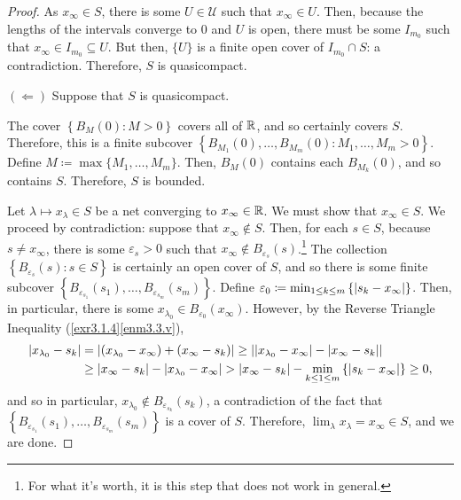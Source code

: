 \begin{thm}
\begin{savenotes}
\begin{proof}
As $x_\infty \in S$, there is some $U\in \mathcal{U}$ such that $x_\infty \in U$.  Then, because the lengths of the intervals converge to $0$ and $U$ is open, there must be some $I_{m_0}$ such that $x_\infty \in I_{m_0}\subseteq U$.  But then, $\{ U\}$ is a finite open cover of $I_{m_0}\cap S$:  a contradiction.  Therefore, $S$ is quasicompact.

\blankline
\noindent
$(\Leftarrow )$
Suppose that $S$ is quasicompact.

The cover $\left\{ B_M(0):M>0\right\}$ covers all of $\mathbb{R}$, and so certainly covers $S$.  Therefore, this is a finite subcover $\left\{ B_{M_1}(0),\ldots ,B_{M_m}(0):M_1,\ldots ,M_m>0\right\}$.  Define $M\coloneqq \max \{ M_1,\ldots ,M_m\}$.  Then, $B_M(0)$ contains each $B_{M_k}(0)$, and so contains $S$.  Therefore, $S$ is bounded.

Let $\lambda \mapsto x_\lambda \in S$ be a net converging to $x_\infty \in \mathbb{R}$.  We must show that $x_\infty \in S$.  We proceed by contradiction:  suppose that $x_\infty \notin S$.  Then, for each $s\in S$, because $s\neq x_\infty$, there is some $\varepsilon _s>0$ such that $x_\infty \notin B_{\varepsilon _s}(s)$.\footnote{For what it's worth, it is this step that does not work in general.}  The collection $\left\{ B_{\varepsilon _s}(s):s\in S\right\}$ is certainly an open cover of $S$, and so there is some finite subcover $\left\{ B_{\varepsilon _{s_1}}(s_1),\ldots ,B_{\varepsilon _{s_m}}(s_m)\right\}$.  Define $\varepsilon _0\coloneqq \min _{1\leq k\leq m}\left\{ \lvert s_k-x_\infty\rvert\right\}$.  Then, in particular, there is some $x_{\lambda _0}\in B_{\varepsilon _0}(x_\infty)$.  However, by the Reverse Triangle Inequality (\cref{exr3.1.4}\ref{enm3.3.v}),
\begin{equation}
\begin{split}
\lvert x_{\lambda _0}-s_k\rvert & =\left| (x_{\lambda _0}-x_\infty )+(x_\infty -s_k)\right| \geq \left| \left| x_{\lambda _0}-x_\infty \right| -\left| x_\infty -s_k\right| \right| \\
& \geq \left| x_\infty -s_k\right| -\left| x_{\lambda _0}-x_\infty \right| >\left| x_\infty -s_k\right| -\min _{k\leq 1\leq m}\left\{ \lvert s_k-x_\infty\rvert\right\} \geq 0,
\end{split}
\end{equation}
and so in particular, $x_{\lambda _0}\notin B_{\varepsilon _{s_k}}(s_k)$, a contradiction of the fact that $\left\{ B_{\varepsilon _{s_1}}(s_1),\ldots ,B_{\varepsilon _{s_m}}(s_m)\right\}$ is a cover of $S$.  Therefore, $\lim _\lambda x_\lambda =x_\infty \in S$, and we are done.
\end{proof}
\end{savenotes}
\end{thm}

